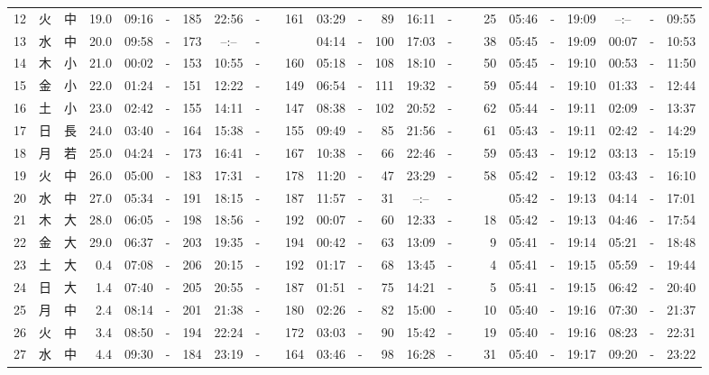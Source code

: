 \documentclass[12pt,a4j]{jsarticle}
\begin{document}
\begin{table}[htbp]
\begin{center}
{\begin{tabular}{|rc|cr|ccrccr|ccrccr|ccc|ccc|}
12 & 火 & 中 & 19.0 &  09:16 &-& 185 &  22:56 &-& 161 &  03:29 &-&  89 &  16:11 &-&  25 & 05:46 & -& 19:09 & --:-- & -& 09:55 \\
13 & 水 & 中 & 20.0 &  09:58 &-& 173 &  --:-- &-&~~~~~ &  04:14 &-& 100 &  17:03 &-&  38 & 05:45 & -& 19:09 & 00:07 & -& 10:53 \\
14 & 木 & 小 & 21.0 &  00:02 &-& 153 &  10:55 &-& 160 &  05:18 &-& 108 &  18:10 &-&  50 & 05:45 & -& 19:10 & 00:53 & -& 11:50 \\
15 & 金 & 小 & 22.0 &  01:24 &-& 151 &  12:22 &-& 149 &  06:54 &-& 111 &  19:32 &-&  59 & 05:44 & -& 19:10 & 01:33 & -& 12:44 \\
16 & 土 & 小 & 23.0 &  02:42 &-& 155 &  14:11 &-& 147 &  08:38 &-& 102 &  20:52 &-&  62 & 05:44 & -& 19:11 & 02:09 & -& 13:37 \\
17 & 日 & 長 & 24.0 &  03:40 &-& 164 &  15:38 &-& 155 &  09:49 &-&  85 &  21:56 &-&  61 & 05:43 & -& 19:11 & 02:42 & -& 14:29 \\
18 & 月 & 若 & 25.0 &  04:24 &-& 173 &  16:41 &-& 167 &  10:38 &-&  66 &  22:46 &-&  59 & 05:43 & -& 19:12 & 03:13 & -& 15:19 \\
19 & 火 & 中 & 26.0 &  05:00 &-& 183 &  17:31 &-& 178 &  11:20 &-&  47 &  23:29 &-&  58 & 05:42 & -& 19:12 & 03:43 & -& 16:10 \\
20 & 水 & 中 & 27.0 &  05:34 &-& 191 &  18:15 &-& 187 &  11:57 &-&  31 &  --:-- &-&~~~~~ & 05:42 & -& 19:13 & 04:14 & -& 17:01 \\
21 & 木 & 大 & 28.0 &  06:05 &-& 198 &  18:56 &-& 192 &  00:07 &-&  60 &  12:33 &-&  18 & 05:42 & -& 19:13 & 04:46 & -& 17:54 \\
22 & 金 & 大 & 29.0 &  06:37 &-& 203 &  19:35 &-& 194 &  00:42 &-&  63 &  13:09 &-&   9 & 05:41 & -& 19:14 & 05:21 & -& 18:48 \\
23 & 土 & 大 &  0.4 &  07:08 &-& 206 &  20:15 &-& 192 &  01:17 &-&  68 &  13:45 &-&   4 & 05:41 & -& 19:15 & 05:59 & -& 19:44 \\
24 & 日 & 大 &  1.4 &  07:40 &-& 205 &  20:55 &-& 187 &  01:51 &-&  75 &  14:21 &-&   5 & 05:41 & -& 19:15 & 06:42 & -& 20:40 \\
25 & 月 & 中 &  2.4 &  08:14 &-& 201 &  21:38 &-& 180 &  02:26 &-&  82 &  15:00 &-&  10 & 05:40 & -& 19:16 & 07:30 & -& 21:37 \\
26 & 火 & 中 &  3.4 &  08:50 &-& 194 &  22:24 &-& 172 &  03:03 &-&  90 &  15:42 &-&  19 & 05:40 & -& 19:16 & 08:23 & -& 22:31 \\
27 & 水 & 中 &  4.4 &  09:30 &-& 184 &  23:19 &-& 164 &  03:46 &-&  98 &  16:28 &-&  31 & 05:40 & -& 19:17 & 09:20 & -& 23:22 \\

\end{tabular}}
\end{center}
\end{table}
\end{document}

